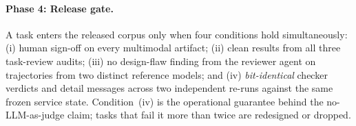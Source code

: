 \paragraph{Phase 4: Release gate.} A task enters the released corpus only when four conditions hold simultaneously: (i) human sign-off on every multimodal artifact; (ii) clean results from all three task-review audits; (iii) no design-flaw finding from the reviewer agent on trajectories from two distinct reference models; and (iv) \emph{bit-identical} checker verdicts and detail messages across two independent re-runs against the same frozen service state. Condition~(iv) is the operational guarantee behind the no-LLM-as-judge claim; tasks that fail it more than twice are redesigned or dropped.


